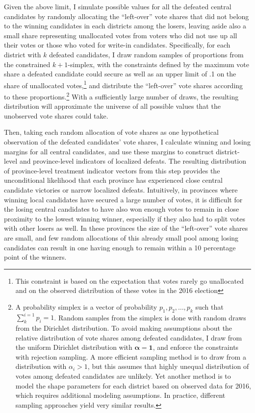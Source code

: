 \documentclass[12pt]{article}
\newcommand{\1}{\mathbbm{1}}
\begin{document}
Given the above limit, I simulate possible values for all the defeated central candidates by randomly allocating the ``left-over'' vote shares that did not belong to the winning candidates in each districts among the losers, leaving aside also a small share representing unallocated votes from voters who did not use up all their votes or those who voted for write-in candidates. Specifically, for each district with $k$ defeated candidates, I draw random samples of proportions from the constrained $k+1$-simplex, with the constraints defined by the maximum vote share a defeated candidate could secure as well as an upper limit of .1 on the share of unallocated votes,\footnote{This constraint is based on the expectation that votes rarely go unallocated and on the observed distribution of these votes in the 2016 election} and distribute the ``left-over'' vote shares according to these proportions.\footnote{A probability simplex is a vector of probability $p_1, p_2, \dots, p_k$ such that $\sum_{k}^{i=1}p_i = 1$. Random samples from the simplex is done with random draws from the Dirichlet distribution. To avoid making assumptions about the relative distribution of vote shares among defeated candidates, I draw from the uniform Dirichlet distribution with $\mathbf{\alpha} = \mathbf{1}$, and enforce the constraints with rejection sampling. A more efficient sampling method is to draw from a distribution with $\alpha_i > 1$, but this assumes that highly unequal distribution of votes among defeated candidates are unlikely. Yet another method is to model the shape parameters for each district based on observed data for 2016, which requires additional modeling assumptions. In practice, different sampling approaches yield very similar results.} With a sufficiently large number of draws, the resulting distribution will approximate the universe of all possible values that the unobserved vote shares could take.

Then, taking each random allocation of vote shares as one hypothetical observation of the defeated candidates' vote shares, I calculate winning and losing margins for all central candidates, and use these margins to construct district-level and province-level indicators of localized defeats. The resulting distribution of province-level treatment indicator vectors from this step provides the unconditional likelihood that each province has experienced close central candidate victories or narrow localized defeats. Intuitively, in provinces where winning local candidates have secured a large number of votes, it is difficult for the losing central candidates to have also won enough votes to remain in close proximity to the lowest winning winner, especially if they also had to split votes with other losers as well. In these provinces the size of the ``left-over'' vote shares are small, and few random allocations of this already small pool among losing candidates can result in one having enough to remain within a 10 percentage point of the winners.
\end{document}
